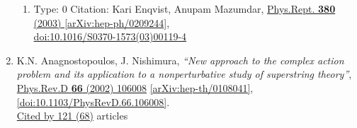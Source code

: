 \documentclass[a4paper,10pt]{article}
\begin{document}
\begin{enumerate}
\begin{enumerate}
  \item Type: 0 Citation: Kari Enqvist, Anupam Mazumdar, \href{https://www.doi.org/10.1016/S0370-1573(03)00119-4}{Phys.Rept. {\bf 380} (2003) }  \href{https://arxiv.org/abs/hep-ph/0209244}{[arXiv:hep-ph/0209244]},\\\href{https://www.doi.org/10.1016/S0370-1573(03)00119-4}{doi:10.1016/S0370-1573(03)00119-4}
\end{enumerate}
\item K.N. Anagnostopoulos, J. Nishimura, {\it ``New approach to the complex action problem and its application to a nonperturbative study of superstring theory''}, \href{https://www.doi.org/10.1103/PhysRevD.66.106008}{Phys.Rev.D {\bf 66} (2002) 106008} \href{https://arxiv.org/abs/hep-th/0108041}{[arXiv:hep-th/0108041]}, \href{https://www.doi.org/10.1103/PhysRevD.66.106008}{[doi:10.1103/PhysRevD.66.106008]}.
\\\href{https://inspirehep.net/literature/?q=refersto%3Arecid%3A561215}{Cited by 121 (68)} articles


\end{enumerate}
\end{document}
